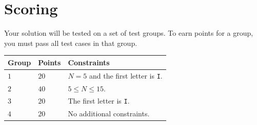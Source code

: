 \section*{Scoring}
Your solution will be tested on a set of test groups.
To earn points for a group, you must pass all test cases in that group.
\noindent
\begin{tabular}{| l | l | l |}
\hline
  Group & Points & Constraints \\ \hline
  $1$    & $20$       &  $N=5$ and the first letter is \texttt{I}.\\ \hline 
  $2$    & $40$       &  $5\le N\le 15$. \\ \hline 
  $3$    & $20$       &  The first letter is \texttt{I}.\\ \hline 
  $4$    & $20$       &  No additional constraints. \\ \hline
\end{tabular}
